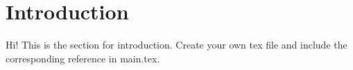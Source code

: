 \chapter{Introduction}

Hi! This is the section for introduction.
Create your own tex file and include the corresponding reference in main.tex.
